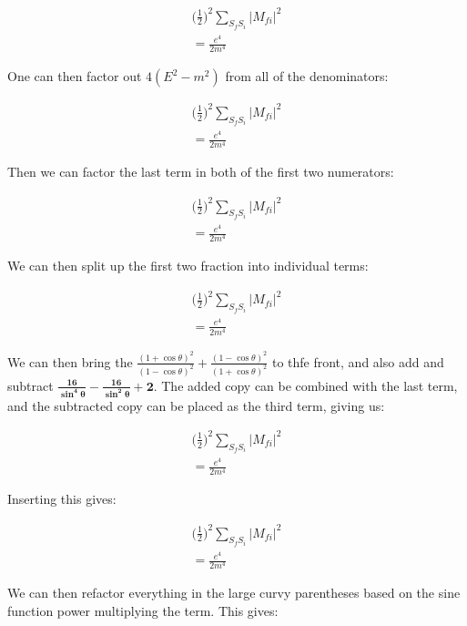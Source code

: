\documentclass[a4]{article}
\begin{document}
    \begin{eqnarray}
        \bigg( \frac{1}{2} \bigg)^2 \sum_{S_f S_i} |M_{f i}|^2 \\
        = \frac{e^4}{2 m^4}
    \end{eqnarray}

    One can then factor out $4 (E^2 - m^2)$ from all of the denominators:

    \begin{eqnarray}
        \bigg( \frac{1}{2} \bigg)^2 \sum_{S_f S_i} |M_{f i}|^2 \\
        = \frac{e^4}{2 m^4}
    \end{eqnarray}

    Then we can factor the last term in both of the first two numerators:

    \begin{eqnarray}
        \bigg( \frac{1}{2} \bigg)^2 \sum_{S_f S_i} |M_{f i}|^2 \\
        = \frac{e^4}{2 m^4}
    \end{eqnarray}

    We can then split up the first two fraction into individual terms:

    \begin{eqnarray}
        \bigg( \frac{1}{2} \bigg)^2 \sum_{S_f S_i} |M_{f i}|^2 \\
        = \frac{e^4}{2 m^4}
    \end{eqnarray}

    We can then bring the $\frac{(1 + \cos \theta)^2}{(1 - \cos \theta)^2} + \frac{(1 - \cos \theta)^2}{(1 + \cos \theta)^2}$ to thfe front, and also add and subtract $\mathbf{\frac{16}{\sin^4 \theta} - \frac{16}{\sin^2 \theta} + 2}$. The added
    copy can be combined with the last term, and the subtracted copy can be placed as the third term, giving us:

    \begin{eqnarray}
        \bigg( \frac{1}{2} \bigg)^2 \sum_{S_f S_i} |M_{f i}|^2 \\
        = \frac{e^4}{2 m^4}
    \end{eqnarray}

    Inserting this gives:

    \begin{eqnarray}
        \bigg( \frac{1}{2} \bigg)^2 \sum_{S_f S_i} |M_{f i}|^2 \\
        = \frac{e^4}{2 m^4}
    \end{eqnarray}

    We can then refactor everything in the large curvy parentheses based on the sine function power multiplying the term. This gives:
\end{document}
